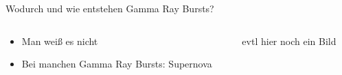 \begin{frame}{Wodurch und wie entstehen Gamma Ray Bursts?}
  \begin{columns}
 \begin{column}{0.4\textwidth}
  \begin{itemize}
      \setlength\itemsep{2em}
    \item  Man weiß es nicht
    \item  Bei manchen Gamma Ray Bursts: Supernova
  \end{itemize}
\vspace{2em}
\end{column}
\begin{column}{0.6\textwidth}
  evtl hier noch ein Bild

\end{column}
  \end{columns}
\end{frame}




